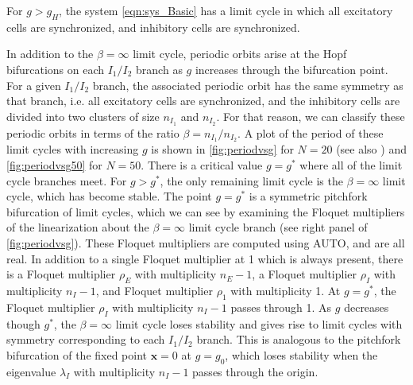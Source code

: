\documentclass[reqno]{siamonline190516}
\newcommand{\xvec}{\mathbf{x}}
\begin{document}
\begin{proposition}\label{prop:limitcycle}
For $g > g_H$, the system \cref{eqn:sys_Basic} has a limit cycle in which all excitatory cells are synchronized, and inhibitory cells are synchronized.
\end{proposition}

In addition to the $\beta = \infty$ limit cycle, periodic orbits arise at the Hopf bifurcations on each $I_1/I_2$ branch as $g$ increases through the bifurcation point. For a given $I_1/I_2$ branch, the associated periodic orbit has the same symmetry as that branch, i.e. all excitatory cells are synchronized, and the inhibitory cells are divided into two clusters of size $n_{I_1}$ and $n_{I_2}$. For that reason, we can classify these periodic orbits in terms of the ratio $\beta = n_{I_1}/n_{I_2}$. A plot of the period of these limit cycles with increasing $g$ is shown in \cref{fig:periodvsg} for $N=20$ (see also \cite[Fig. 2]{Barreiro2017}) and \cref{fig:periodvsg50} for $N=50$. There is a critical value $g = g^*$ where all of the limit cycle branches meet. For $g > g^*$, the only remaining limit cycle is the $\beta = \infty$ limit cycle, which has become stable. The point $g = g^*$ is a symmetric pitchfork bifurcation of limit cycles, which we can see by examining the Floquet multipliers of the linearization about the $\beta = \infty$ limit cycle branch (see right panel of \cref{fig:periodvsg}). These Floquet multipliers are computed using AUTO, and are all real. In addition to a single Floquet multiplier at 1 which is always present, there is a Floquet multiplier $\rho_E$ with multiplicity $n_E - 1$, a Floquet multiplier $\rho_I$ with multiplicity $n_I - 1$, and Floquet multiplier $\rho_1$ with multiplicity 1. At $g = g^*$, the Floquet multiplier $\rho_I$ with multiplicity $n_I - 1$ passes through 1. As $g$ decreases though $g^*$, the $\beta = \infty$ limit cycle loses stability and gives rise to limit cycles with symmetry corresponding to each $I_1/I_2$ branch. This is analogous to the pitchfork bifurcation of the fixed point $\xvec = 0$ at $g = g_0$, which loses stability when the eigenvalue $\lambda_I$ with multiplicity $n_I - 1$ passes through the origin.
\end{document}
